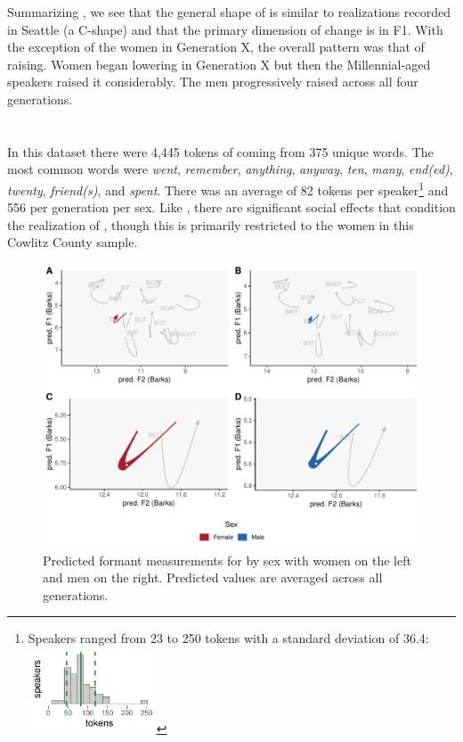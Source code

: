 Summarizing \ban, we see that the general shape of \ban is similar to realizations recorded in Seattle (a C-shape) and that the primary dimension of change is in F1. With the exception of the women in Generation X, the overall pattern was that of raising. Women began lowering \ban in Generation X but then the Millennial-aged speakers raised it considerably. The men progressively raised \ban across all four generations.






\section{\ben}
\label{BEN}

In this dataset there were 4,445 tokens of \ben coming from 375 unique words. The most common words were \textit{went}, \textit{remember}, \textit{anything}, \textit{anyway}, \textit{ten}, \textit{many}, \textit{end(ed)}, \textit{twenty}, \textit{friend(s)}, and \textit{spent}. There was an average of 82 tokens per speaker\footnote{Speakers ranged from 23 to 250 tokens with a standard deviation of 36.4: \includegraphics[width = 1.5in]{Figures/BEN/BEN_tiny.pdf}} and 556 per generation per sex. Like \ban, there are significant social effects that condition the realization of \ben, though this is primarily restricted to the women in this Cowlitz County sample.

\begin{figure}[tb!]
    \centering
    \includegraphics[width = 6.5in]{Figures/BEN/BEN_four_panel_plot_summarized.pdf}
    \caption[Predicted formant measurements for \ben by sex.]{Predicted formant measurements for \ben by sex with women on the left and men on the right. Predicted values are averaged across all generations.}
    \label{fig:BEN_four_panel_plot_summarized}
\end{figure}

